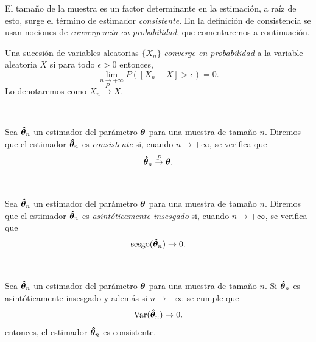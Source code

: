 \documentclass[oneside,openright,titlepage,numbers=noenddot,openany,headinclude,footinclude=true,
cleardoublepage=empty,abstractoff,BCOR=5mm,paper=a4,fontsize=12pt,main=spanish]{scrreprt}
\begin{document}
El tamaño de la muestra es un factor determinante en la estimación, a raíz de esto, surge el término de estimador \textit{consistente}. En la definición de consistencia se usan nociones de \textit{convergencia en probabilidad}, que comentaremos a continuación.\\

\begin{definition}
Una sucesión de variables aleatorias $\{X_n\}$ \textit{converge en probabilidad} a la variable aleatoria $X$ si para todo $\epsilon>0$ entonces, $$\lim_{n\to +\infty}P([X_n-X]>\epsilon)=0.$$
Lo denotaremos como $X_n \overset{P}{\to} X.$
\end{definition}\

\begin{definition}
Sea $\bm{\hat{\theta}}_n$ un estimador del parámetro $\bm{\theta}$ para una muestra de tamaño $n$. Diremos que el estimador $\bm{\hat{\theta}}_n$ es \textit{consistente} si, cuando $n\to +\infty$, se verifica que $$\bm{\hat{\theta}}_n \overset{P}{\to} \bm{\theta}.$$
\end{definition}\

\begin{definition}
Sea $\bm{\hat{\theta}}_n$ un estimador del parámetro $\bm{\theta}$ para una muestra de tamaño $n$. Diremos que el estimador $\bm{\hat{\theta}}_n$ es \textit{asintóticamente insesgado} si, cuando $n\to +\infty$, se verifica que $$\text{sesgo}(\bm{\hat{\theta}}_n) \to 0.$$
\end{definition}\

\begin{corollary} \label{cor:lemaestima}
Sea $\bm{\hat{\theta}}_n$ un estimador del parámetro $\bm{\theta}$ para una muestra de tamaño $n$. Si $\bm{\hat{\theta}}_n$ es asintóticamente insesgado y además si $n\to +\infty$ se cumple que $$\text{Var}(\bm{\hat{\theta}}_n)\to 0.$$
entonces, el estimador $\bm{\hat{\theta}}_n$ es consistente.
\end{corollary}\
\end{document}
